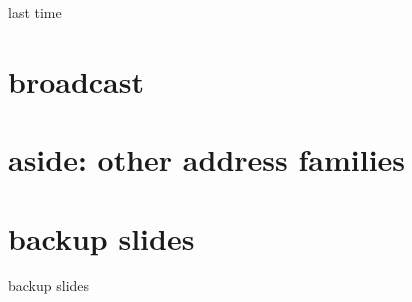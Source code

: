 \date{}
\title{}
\date{}

\begin{frame}
    \titlepage
\end{frame}

\begin{frame}{last time}
\end{frame}

\section{broadcast}


\section{aside: other address families}




\section{backup slides}
\begin{frame}{backup slides}
\end{frame}


